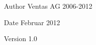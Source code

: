 \begin{DoxyAuthor}{Author}
Ventas AG 2006-\/2012 
\end{DoxyAuthor}
\begin{DoxyDate}{Date}
Februar 2012 
\end{DoxyDate}
\begin{DoxyVersion}{Version}
1.0 
\end{DoxyVersion}

